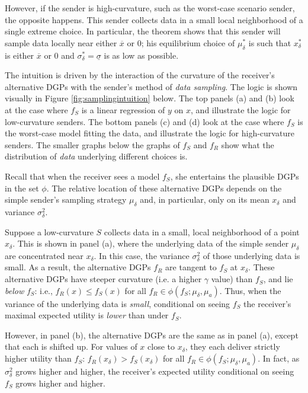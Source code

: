 \documentclass[11pt,dvipsnames]{article}
\begin{document}
However, if the sender is high-curvature, such as the worst-case scenario sender, the opposite happens.
This sender collects data in a small local neighborhood of a single extreme choice.
In particular, the theorem shows that this sender will sample data locally near either $\overline{x}$ or $0$; his equilibrium choice of $\mu_\delta^*$ is such that $x_\delta^*$ is either $\overline{x}$ or $0$ and $\sigma_\delta^* = \underline{\sigma}$ is as low as possible.

The intuition is driven by the interaction of the curvature of the receiver's alternative DGPs with the sender's method of \emph{data sampling}. The logic is shown visually in Figure \ref{fig:samplingintuition} below. 
The top panels (a) and (b) look at the case where $f_S$ is a linear regression of $y$ on $x$, and illustrate the logic for low-curvature senders.
The bottom panels (c) and (d) look at the case where $f_S$ is the worst-case model fitting the data, and illustrate the logic for high-curvature senders.
The smaller graphs below the graphs of $f_S$ and $f_R$ show what the distribution of \emph{data} underlying different choices is.

Recall that when the receiver sees a model $f_S$, she entertains the plausible DGPs in the set $\phi$.
The relative location of these alternative DGPs depends on the simple sender's sampling strategy $\mu_\delta$ and, in particular, only on its mean $x_\delta$ and variance $\sigma_\delta^2$.

Suppose a low-curvature $S$ collects data in a small, local neighborhood of a point $x_\delta$.
This is shown in panel (a), where the underlying data of the simple sender $\mu_\delta$ are concentrated near $x_\delta$.
In this case, the variance $\sigma_\delta^2$ of those underlying data is small.
As a result, the alternative DGPs $f_R$ are tangent to $f_S$ at $x_\delta$.
These alternative DGPs have steeper curvature (i.e. a higher $\gamma$ value) than $f_S$, and lie \emph{below} $f_S$: i.e., $f_R(x) \leq f_S(x)$ for all $f_R \in \phi(f_S;\mu_\delta,\mu_a)$.
Thus, when the variance of the underlying data is \emph{small}, conditional on seeing $f_S$ the receiver's maximal expected utility is \emph{lower} than under $f_S$.

However, in panel (b), the alternative DGPs are the same as in panel (a), except that each is shifted up.
For values of $x$ close to $x_\delta$, they each deliver strictly higher utility than $f_S$: $f_R(x_\delta) > f_S(x_\delta)$ for all $f_R \in \phi(f_S;\mu_\delta,\mu_a)$.
In fact, as $\sigma_\delta^2$ grows higher and higher, the receiver's expected utility conditional on seeing $f_S$ grows higher and higher.
\end{document}
